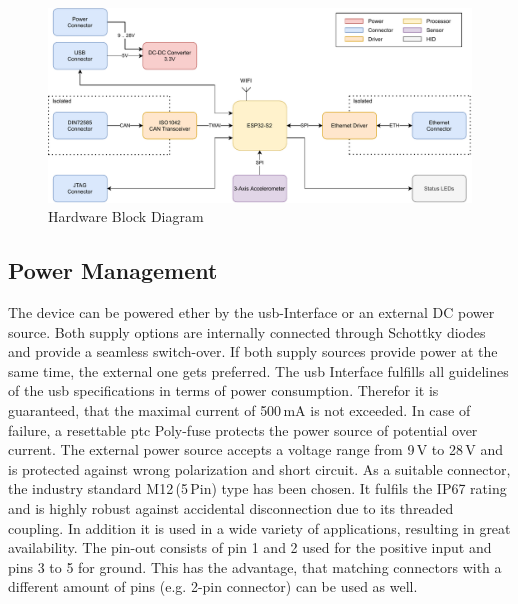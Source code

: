 \medskip
\begin{figure}[h!]
	\centering
	\includegraphics[width=\textwidth]{images/fleet_monitor_hardware}
	\vspace{0.1cm}
	\caption{Hardware Block Diagram}
	\label{fig:hardware-block-diagram}
\end{figure}

\subsection{Power Management}
The device can be powered ether by the \acrshort{usb}-Interface or an external DC power source. Both supply options are internally connected through Schottky diodes and provide a seamless switch-over. If both supply sources provide power at the same time, the external one gets preferred.\newline
The \acrfull{usb} Interface fulfills all guidelines of the \acrshort{usb} specifications in terms of power consumption. Therefor it is guaranteed, that the maximal current of 500\,mA is not exceeded. In case of failure, a resettable \acrshort{ptc} Poly-fuse protects the power source of potential over current.\newline
The external power source accepts a voltage range from 9\,V to 28\,V and is protected against wrong polarization and short circuit. As a suitable connector, the industry standard M12\,(5\,Pin) type has been chosen. It fulfils the IP67 rating and is highly robust against accidental disconnection due to its threaded coupling. In addition it is used in a wide variety of applications, resulting in great availability. The pin-out consists of pin 1 and 2 used for the positive input and pins 3 to 5 for ground. This has the advantage, that matching connectors with a different amount of pins (e.g. 2-pin connector) can be used as well.

